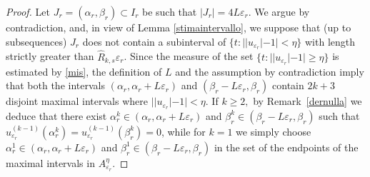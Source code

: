 \documentclass{article}
\newcommand{\e}{\varepsilon}
\begin{document}
\begin{proof} 
Let $J_r=(\alpha_r,\beta_r)\subset I_r$ be such that $|J_r|=4L\e_r$.  
We argue by contradiction, and, in view of Lemma \ref{stimaintervallo}, we suppose that (up to subsequences) $J_r$ does not contain a subinterval of $\{t:||u_{\e_r}|-1|<\eta\}$ with length strictly greater than $\widehat R_{k,s}\e_r$. 
Since the measure of the set 
$\{t:||u_{\e_r}|-1|\geq\eta \}$ is estimated by \eqref{mis},  the definition of $L$ and the assumption by contradiction imply that
both the intervals $(\alpha_r, \alpha_r+L\e_r)$ and $(\beta_r-L\e_r, \beta_r)$ contain $2k+3$ disjoint maximal intervals where $||u_{\e_r}|-1|<\eta$. 
If $k\geq 2,$ by Remark~\ref{dernulla} we deduce that there exist $\alpha^k_r\in(\alpha_r, \alpha_r+L\e_r)$
and $\beta^k_r\in (\beta_r-L\e_r, \beta_r)$ such that $u^{(k-1)}_{\e_r}(\alpha^k_r)=u^{(k-1)}_{\e_r}(\beta^k_r)=0$, while for $k=1$ we simply choose
$\alpha^1_r\in(\alpha_r, \alpha_r+L\e_r)$
and $\beta^1_r\in (\beta_r-L\e_r, \beta_r)$ in the set of the endpoints of the maximal intervals in $A_{\e_r}^\eta$. 



\end{proof}
\end{document}
